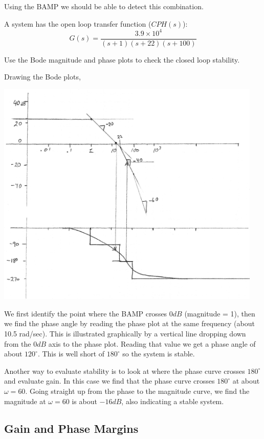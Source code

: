 Using the BAMP we should be able to detect this combination.

\clearpage
\begin{ExampleSmall}\label{bodestabilityexample}
A system has the open loop transfer function ($CPH(s)$):
\[
G(s) = \frac {3.9\times 10^4} {(s+1)(s+22)(s+100)}
\]

Use the Bode magnitude and phase plots to check the closed loop stability.

Drawing the Bode plots,

\includegraphics[width=5.0in]{figs06/00794aa.png}

We first identify the point where the BAMP crosses 0$dB$ (magnitude = 1), then we find the phase angle by reading the phase plot at the same frequency (about 10.5 rad/sec).   This is illustrated graphically by a vertical line dropping down from the $0dB$ axis to the phase plot.  Reading that value we get a phase angle of about $120^\circ$.  This is well short of $180^\circ$ so the system is stable.

Another way to evaluate stability is to look at where the phase curve crosses $180^\circ$ and evaluate gain.  In this case we find that the phase curve crosses $180^\circ$ at about $\omega=60$.  Going straight up from the phase to the magnitude curve, we find the magnitude at $\omega = 60$ is about $-16dB$, also indicating a stable system.
\end{ExampleSmall}

\subsection{Gain and Phase Margins}\label{GainPhaseMargins}

